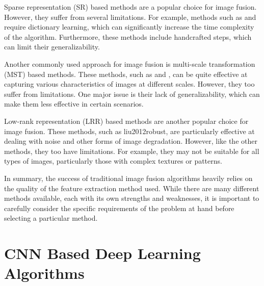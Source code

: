 Sparse representation (SR)\cite{liu2017infrared}  based methods are a popular choice for image fusion. However, they suffer from several limitations. For example, methods such as \cite{bin2016efficient} and \cite{zhang2013dictionary} require dictionary learning, which can significantly increase the time complexity of the algorithm. Furthermore, these methods include handcrafted steps, which can limit their generalizability.

Another commonly used approach for image fusion is multi-scale transformation (MST) based methods. These methods, such as \cite{hu2017adaptive} and \cite{he2017infrared}, can be quite effective at capturing various characteristics of images at different scales. However, they too suffer from limitations. One major issue is their lack of generalizability, which can make them less effective in certain scenarios.

Low-rank representation (LRR) based methods are another popular choice for image fusion. These methods, such as \cite{text}{liu2012robust}, are particularly effective at dealing with noise and other forms of image degradation. However, like the other methods, they too have limitations. For example, they may not be suitable for all types of images, particularly those with complex textures or patterns.

In summary, the success of traditional image fusion algorithms heavily relies on the quality of the feature extraction method used. While there are many different methods available, each with its own strengths and weaknesses, it is important to carefully consider the specific requirements of the problem at hand before selecting a particular method.

\section{CNN Based Deep Learning Algorithms}


